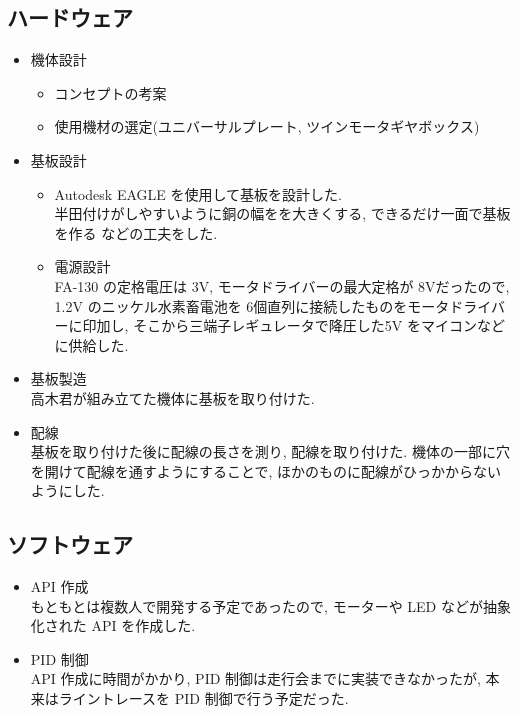 \documentclass[
]{ltjarticle}
\providecommand{\tightlist}{%
  \setlength{\itemsep}{0pt}\setlength{\parskip}{0pt}}
\begin{document}
\subsection{ハードウェア}
\begin{itemize}
    \item   機体設計
    \begin{itemize}
        \item     コンセプトの考案
        \item     使用機材の選定(ユニバーサルプレート, ツインモータギヤボックス)
    \end{itemize}
    \item   基板設計
    \begin{itemize}
        \tightlist
        \item     Autodesk EAGLE を使用して基板を設計した. \\
            半田付けがしやすいように銅の幅をを大きくする, できるだけ一面で基板を作る などの工夫をした. 
        \item     電源設計\\
            FA-130 の定格電圧は 3V, モータドライバーの最大定格が 8Vだったので, 1.2V のニッケル水素畜電池を 6個直列に接続したものをモータドライバーに印加し, そこから三端子レギュレータで降圧した5V をマイコンなどに供給した. 
    \end{itemize}
    \item   基板製造\\
      高木君が組み立てた機体に基板を取り付けた. 
    \item   配線\\
      基板を取り付けた後に配線の長さを測り, 配線を取り付けた. 機体の一部に穴を開けて配線を通すようにすることで, ほかのものに配線がひっかからないようにした. 
    \end{itemize}
    \subsection{ソフトウェア}
    \begin{itemize}
    
    \item  API 作成\\
        もともとは複数人で開発する予定であったので, モーターや LED などが抽象化された API を作成した. 
    \item  PID 制御\\
        API 作成に時間がかかり, PID 制御は走行会までに実装できなかったが, 本来はライントレースを PID 制御で行う予定だった. 
\end{itemize}
\end{document}

